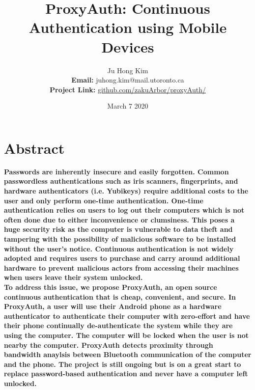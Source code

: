 \documentclass[letterpaper,twocolumn,10pt]{article}
\begin{document}


\doublespacing
\tableofcontents
\onehalfspacing


\title{\Large \bf ProxyAuth: Continuous Authentication using Mobile Devices}

\author{
{\rm Ju Hong Kim}\\
\rm \textbf{Email:} juhong.kim@mail.utoronto.ca\\
\rm \textbf{Project Link:} \href{https://github.com/zakuArbor/proxyAuth/}{github.com/zakuArbor/proxyAuth/}
}
\date{March 7 2020}

\maketitle

\thispagestyle{empty}


\section*{Abstract}
%
\textbf{Passwords are inherently insecure and easily forgotten. Common passwordless authentications such as iris scanners, fingerprints, and hardware authenticators (i.e. Yubikeys) require additional costs to the user and only perform one-time authentication. One-time authentication relies on users to log out their computers which is not often done due to either inconvenience or clumsiness. This poses a huge security risk as the computer is vulnerable to data theft and tampering with the possibility of malicious software to be installed without the user's notice. Continuous authentication is not widely adopted and requires users to purchase and carry around additional hardware to prevent malicious actors from accessing their machines when users leave their system unlocked.\\
To address this issue, we propose ProxyAuth, an open source continuous authentication that is cheap, convenient, and secure. In ProxyAuth, a user will use their Android phone as a hardware authenticator to authenticate their computer with zero-effort and have their phone continually de-authenticate the system while they are using the computer. The computer will be locked when the user is not nearby the computer. ProxyAuth detects proximity through bandwidth anaylsis between Bluetooth communication of the computer and the phone. The project is still ongoing but is on a great start to replace password-based authentication and never have a computer left unlocked.}
\end{document}
